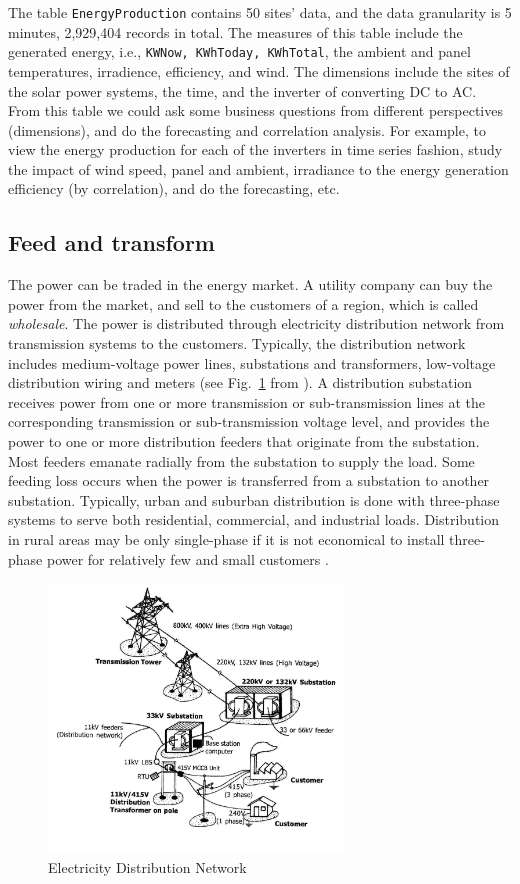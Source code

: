 \documentclass[a4paper,12pt]{llncs}
\newcommand{\ie}{i.e.}
\begin{document}
The table \texttt{EnergyProduction} contains 50 sites' data, and the data granularity is 5 minutes, 2,929,404 records in total.  The measures of this table include the generated energy, \ie, \texttt{KWNow, KWhToday, KWhTotal}, the ambient and panel temperatures, irradience, efficiency, and wind. The dimensions include the sites of the solar power systems, the time, and the inverter of converting DC to AC. From this table we could ask some business questions from different perspectives (dimensions), and do the forecasting and correlation analysis. For example, to view the energy production for each of the inverters in time series fashion, study the impact of wind speed, panel and ambient, irradiance to the energy generation efficiency (by correlation), and  do the forecasting, etc.

\subsection{Feed and transform}
The power can be traded in the energy market. A utility company can buy the power from the market, and sell to the customers of a region, which is called {\em wholesale}.  The power is distributed through electricity distribution network from transmission systems  to the customers. Typically, the distribution network includes medium-voltage power lines, substations and transformers, low-voltage distribution wiring and meters (see Fig.~\ref{fig:distnetwork} from \cite{distnetwork}).  A distribution substation receives power from one or more transmission or sub-transmission lines at the corresponding transmission or sub-transmission voltage level,  and provides the power to one or more distribution feeders that originate from the substation.  Most feeders emanate radially from the substation to supply the load.  Some feeding loss occurs when the power is transferred from a substation to another substation. Typically, urban and suburban distribution is done with three-phase systems to serve both residential, commercial, and industrial loads. Distribution in rural areas may be only single-phase if it is not economical to install three-phase power for relatively few and small customers \cite{Brown}.
\begin{figure}[htp]
\centering
\includegraphics[width=0.7\textwidth]{images/distnetwork}
\caption{Electricity Distribution Network}
\label{fig:distnetwork}
\end{figure}
\end{document}

